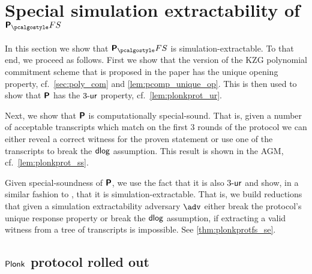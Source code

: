 \documentclass[runningheads,11pt]{llncs}
\let\spvec\vec
\let\vec\accentvec
\let\spvec\vec
\let\vec\spvec
\def\vec#1{\mathchoice{\mbox{\boldmath$\displaystyle#1$}}
  {\mbox{\boldmath$\textstyle#1$}} {\mbox{\boldmath$\scriptstyle#1$}}
  {\mbox{\boldmath$\scriptscriptstyle#1$}}}
\begin{document}
\section{Special simulation extractability of $\plonkprotfs$} 
In this section we show that $\plonkprotfs$ is simulation-extractable. To that
end, we proceed as follows. First we show that the version of the KZG polynomial
commitment scheme that is proposed in the \plonk{} paper has the unique opening
property, cf.~\cref{sec:poly_com} and \cref{lem:pcomp_unique_op}. This is then
used to show that $\bm{\mathsf{P}}$ has the ${3\text{-}\mathsf{ur}}$ property,
cf.~\cref{lem:plonkprot_ur}.

Next, we show that $\bm{\mathsf{P}}$ is computationally special-sound. That is, given a
number of acceptable transcripts which match on the first 3 rounds of the
protocol we can either reveal a correct witness for the proven statement or use
one of the transcripts to break the $\mathsf{dlog}$ assumption. This result is shown in
the AGM, cf.~\cref{lem:plonkprot_ss}.

Given special-soundness of $\bm{\mathsf{P}}$, we use the fact that it is also
${3\text{-}\mathsf{ur}}$ and show, in a similar fashion to \cite{INDOCRYPT:FKMV12}, that it is
simulation-extractable. That is, we build reductions that given a simulation
extractability adversary $\advse$ either break the protocol's unique response
property or break the $\mathsf{dlog}$ assumption, if extracting a valid witness from a
tree of transcripts is impossible. See \cref{thm:plonkprotfs_se}.

\subsection{$\textnormal{\textsf{Plonk}}$ protocol rolled out}
\label{sec:plonk_explained}
\newcommand{\vql}{\vec{q_{L}}}
\newcommand{\vqr}{\vec{q_{R}}}
\newcommand{\vqm}{\vec{q_{M}}}
\newcommand{\vqo}{\vec{q_{O}}}
\newcommand{\vx}{\vec{x}}
\newcommand{\vqc}{\vec{q_{C}}}
\end{document}
